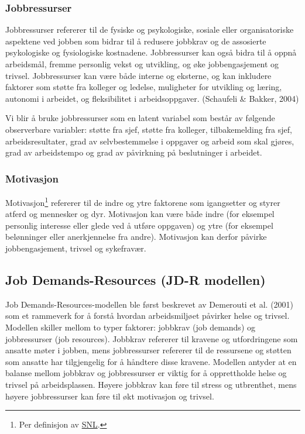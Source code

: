 \documentclass[
  12pt,
  a4paper,
  DIV=11,
  numbers=noendperiod]{scrartcl}
\begin{document}
\subsubsection{Jobbressurser}\label{jobbressurser}

Jobbressurser refererer til de fysiske og psykologiske, sosiale eller
organisatoriske aspektene ved jobben som bidrar til å redusere jobbkrav
og de assosierte psykologiske og fysiologiske kostnadene. Jobbressurser
kan også bidra til å oppnå arbeidsmål, fremme personlig vekst og
utvikling, og øke jobbengasjement og trivsel. Jobbressurser kan være
både interne og eksterne, og kan inkludere faktorer som støtte fra
kolleger og ledelse, muligheter for utvikling og læring, autonomi i
arbeidet, og fleksibilitet i arbeidsoppgaver. (Schaufeli \& Bakker,
2004)

Vi blir å bruke jobbressurser som en latent variabel som består av
følgende observerbare variabler: støtte fra sjef, støtte fra kolleger,
tilbakemelding fra sjef, arbeidsresultater, grad av selvbestemmelse i
oppgaver og arbeid som skal gjøres, grad av arbeidstempo og grad av
påvirkning på beslutninger i arbeidet.

\subsubsection{Motivasjon}\label{motivasjon}

Motivasjon\footnote{Per definisjon av
  \href{https://snl.no/motivasjon\#:~:text=Motivasjon\%20er\%20en\%20samlebetegnelse\%20for,motiveres\%20til\%20\%C3\%A5\%20oppn\%C3\%A5\%20dette}{SNL}.}
refererer til de indre og ytre faktorene som igangsetter og styrer
atferd og mennesker og dyr. Motivasjon kan være både indre (for eksempel
personlig interesse eller glede ved å utføre oppgaven) og ytre (for
eksempel belønninger eller anerkjennelse fra andre). Motivasjon kan
derfor påvirke jobbengasjement, trivsel og sykefravær.

\newpage

\subsection{Job Demands-Resources (JD-R
modellen)}\label{job-demands-resources-jd-r-modellen}

Job Demands-Resources-modellen ble først beskrevet av Demerouti et al.
(2001) som et rammeverk for å forstå hvordan arbeidsmiljøet påvirker
helse og trivsel. Modellen skiller mellom to typer faktorer: jobbkrav
(job demands) og jobbressurser (job resources). Jobbkrav refererer til
kravene og utfordringene som ansatte møter i jobben, mens jobbressurser
refererer til de ressursene og støtten som ansatte har tilgjengelig for
å håndtere disse kravene. Modellen antyder at en balanse mellom jobbkrav
og jobbressurser er viktig for å opprettholde helse og trivsel på
arbeidsplassen. Høyere jobbkrav kan føre til stress og utbrenthet, mens
høyere jobbressurser kan føre til økt motivasjon og trivsel.
\end{document}
